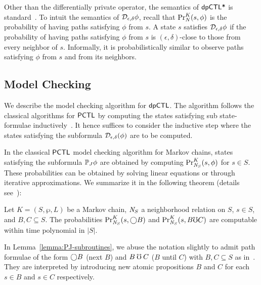 Other than the differentially private operator, the semantics of
$\dpCTLstar$ is standard~\cite{BK:08:PMC}.
To intuit the semantics of $\dpriv{\epsilon}{\delta} \phi$,
recall that  $\myPr{s}{K}{N}{\phi}$ is the probability of having
paths satisfying $\phi$ from $s$. A state $s$ satisfies
$\dpriv{\epsilon}{\delta} \phi$ if the probability of
having paths satisfying $\phi$ from $s$ is $(\epsilon, \delta)$-close
to those from every neighbor of $s$. Informally, it is
probabilistically similar to observe paths satisfying $\phi$ from $s$
and from its neighbors.

\subsection{Model Checking}
We describe the model checking algorithm for $\dpCTL$. The algorithm follows the classical
algorithms for $\PCTL$ by computing the states satisfying
sub state-formulae inductively~\cite{HanssonJ94,BK:08:PMC}. It hence suffices to
consider the inductive step where the states satisfying the subformula
$\dpriv{\epsilon}{\delta} (\phi)$ are to be computed.


In the classical $\PCTL$ model checking algorithm for Markov chains,
states satisfying the subformula $\PJ{J} \phi$ are obtained by
computing $\myPr{s}{K}{\neighbor{S}}{\phi}$ for $s \in S$.
These probabilities can be obtained by solving linear equations or
through iterative approximations. We summarize it in the following
theorem (details see~\cite{BK:08:PMC}):

\begin{lemma}
  Let $K = (S, \wp, L)$ be a Markov chain, $\neighbor{S}$ a
  neighborhood relation on $S$, $s
  \in S$, and $B, C \subseteq S$. The probabilities
  $\myPr{s}{K}{\neighbor{S}}{\gX B}$ and
  $\myPr{s}{K}{\neighbor{S}}{B \mho C}$
\hide{
  $\Pr[\{ \pi : K, \neighbor{K}, \pi \models B \buntil{n} C \textmd{
    with } \pi_0 = s \}]$
} are computable within time polynomial in
  $|S|$.
  \label{lemma:PJ-subroutines}
\end{lemma}

In Lemma~\ref{lemma:PJ-subroutines}, we abuse the notation slightly to
admit path formulae of the form $\gX B$ (next $B$) and
$B \guntil C$ ($B$ until $C$) with $B, C \subseteq S$ as
in~\cite{BK:08:PMC}. They are interpreted by introducing new atomic
propositions $B$ and $C$ for each $s \in B$ and $s \in C$
respectively.

